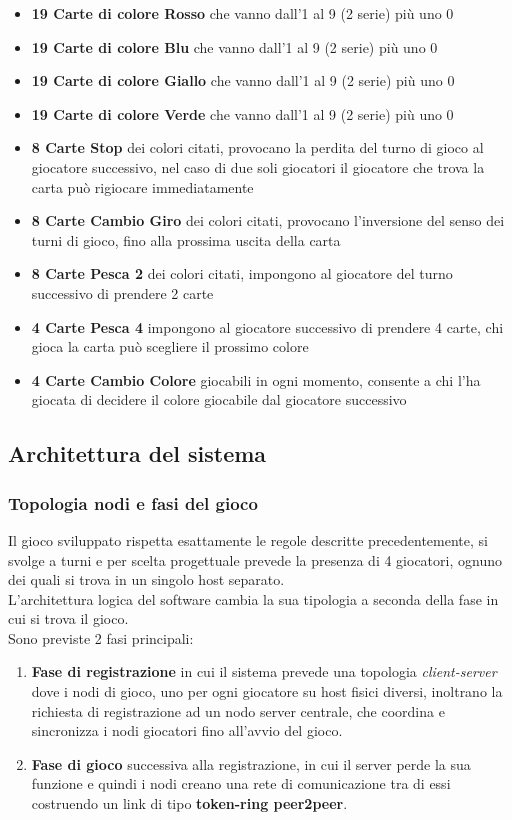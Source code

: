 \documentclass[10pt,a4paper]{article}
\begin{document}
\begin{itemize}
\item \textbf{19 Carte di colore Rosso} che vanno dall'1 al 9 (2 serie) più uno 0
\item \textbf{19 Carte di colore Blu} che vanno dall'1 al 9 (2 serie) più uno 0
\item \textbf{19 Carte di colore Giallo} che vanno dall'1 al 9 (2 serie) più uno 0
\item \textbf{19 Carte di colore Verde} che vanno dall'1 al 9 (2 serie) più uno 0

\item \textbf{8  Carte Stop} dei colori citati, provocano la perdita del turno di gioco al giocatore successivo, nel caso di due soli giocatori il giocatore che trova la carta può rigiocare immediatamente
\item \textbf{8  Carte Cambio Giro} dei colori citati, provocano l'inversione del senso dei turni di gioco, fino alla prossima uscita della carta
\item \textbf{8  Carte Pesca 2} dei colori citati, impongono al giocatore del turno successivo di prendere 2 carte

\item \textbf{4 Carte Pesca 4} impongono al giocatore successivo di prendere 4 carte, chi gioca la carta può scegliere il prossimo colore
\item \textbf{4 Carte Cambio Colore} giocabili in ogni momento, consente a chi l'ha giocata di decidere il colore giocabile dal giocatore successivo
\end{itemize}


\subsection{Architettura del sistema}

\subsubsection{Topologia nodi e fasi del gioco}
Il gioco sviluppato rispetta esattamente le regole descritte precedentemente, si svolge a turni e per scelta progettuale prevede la presenza di 4 giocatori, ognuno dei quali si trova in un singolo host separato.\\ L'architettura logica del software cambia la sua tipologia a seconda della fase in cui si trova il gioco.\\ Sono previste 2 fasi principali:

\begin{enumerate}
\item\textbf{Fase di registrazione} in cui il sistema prevede una topologia \textit{client-server} dove i nodi di gioco, uno per ogni giocatore su host fisici diversi, inoltrano la richiesta di registrazione ad un nodo server centrale, che coordina e sincronizza i nodi giocatori fino all'avvio del gioco.

\item\textbf{Fase di gioco} successiva alla registrazione, in cui il server perde la sua funzione e quindi i nodi creano una rete di comunicazione tra di essi costruendo un link di tipo \textbf{token-ring peer2peer}.
\end{enumerate}
\end{document}
